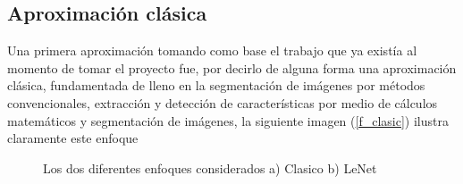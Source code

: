 \documentclass[12pt]{book} %
\begin{document}
	\subsection{Aproximación clásica \label{clasica}}
		Una primera aproximación tomando como base el trabajo que ya existía al momento de tomar el proyecto fue, por decirlo de alguna forma una aproximación 
		clásica, fundamentada de lleno en la segmentación de imágenes por métodos convencionales, extracción y detección de características por medio de 
		cálculos matemáticos y segmentación de imágenes, la siguiente imagen (\ref{f_clasic}) ilustra claramente este enfoque\\
		\begin{figure}[t]
		 	\centering
			\caption{Los dos diferentes enfoques considerados a) Clasico b) LeNet} 
			\label{fig:enfoque_clásico}
		\end{figure}
\end{document}
